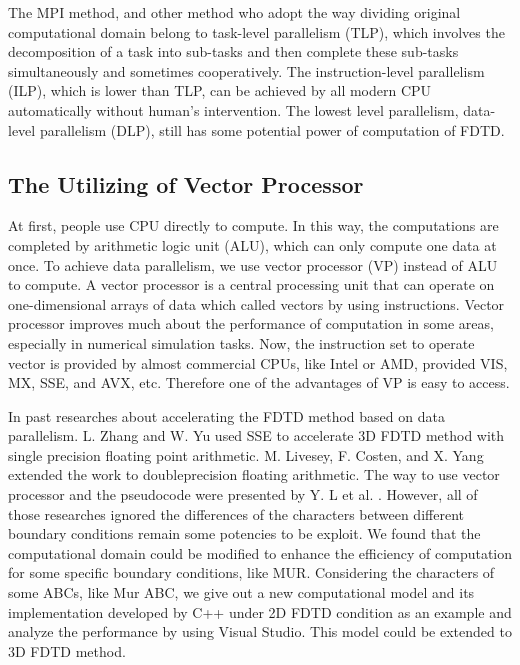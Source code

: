 The MPI method, and other method who adopt the way dividing original computational domain belong to task-level parallelism (TLP), which involves the decomposition of a task into sub-tasks and then complete these sub-tasks simultaneously and sometimes cooperatively. The instruction-level parallelism (ILP), which is lower than TLP, can be achieved by all modern CPU automatically without human's intervention. The lowest level parallelism, data-level parallelism (DLP), still has some potential power of computation of FDTD.

\subsection{The Utilizing of Vector Processor}
At first, people use CPU directly to compute. In this way, the computations are completed by arithmetic logic unit (ALU), which can only compute one data at once. To achieve data parallelism, we use vector processor (VP) instead of ALU to compute. A vector processor is a  central processing unit that can operate on one-dimensional arrays of data which called vectors by using instructions. Vector processor improves much about the performance of computation in some areas, especially in numerical simulation tasks. Now, the instruction set to operate vector is provided by
almost commercial CPUs, like Intel or AMD, provided VIS, MX, SSE, and AVX, etc. Therefore one of the advantages of VP is easy to access.

In past researches about accelerating the FDTD method based on data parallelism. L. Zhang and W. Yu
\cite{LZhangandWYu} used SSE to accelerate 3D FDTD method with single precision floating point arithmetic. M. Livesey, F. Costen, and X. Yang \cite{Doubleprecision} extended the work to doubleprecision floating arithmetic. The way to use vector processor and the pseudocode were
presented by Y. L et al. \cite{AdvancedFDTDMethod}. However, all of those researches ignored the differences of the characters between different boundary conditions remain some potencies to be exploit. We found that the computational domain could be modified to enhance the efficiency of computation for some specific boundary conditions, like MUR. Considering the characters of some ABCs, like Mur ABC, we give out a new computational model and its implementation developed by C++ under 2D FDTD condition as an example and analyze the performance by using Visual Studio. This model could be extended to 3D FDTD method.

